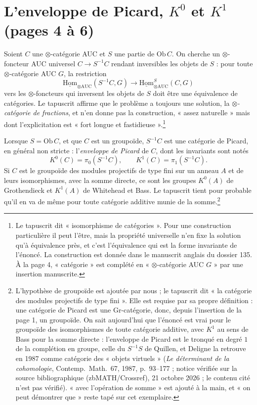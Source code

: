 \documentclass[11pt,a4paper]{article}
\begin{document}
\section*{L'enveloppe de Picard, $K^0$ et $K^1$ (pages 4 à 6)}

Soient $C$ une $\otimes$-catégorie AUC et $S$ une partie de $\mathrm{Ob}\,C$.
On cherche un $\otimes$-foncteur AUC universel $C \to S^{-1}C$ rendant
inversibles les objets de $S$ : pour toute $\otimes$-catégorie AUC $G$, la
restriction
\[ \underline{\mathrm{Hom}}_{\otimes \mathrm{AUC}}(S^{-1}C, G) \longrightarrow
   \underline{\mathrm{Hom}}^{S}_{\otimes \mathrm{AUC}}(C, G) \]
vers les $\otimes$-foncteurs qui inversent les objets de $S$ doit être une
équivalence de catégories. Le tapuscrit affirme que le problème a toujours une
solution, la \emph{$\otimes$-catégorie de fractions}, et n'en donne pas la
construction, « assez naturelle » mais dont l'explicitation est « fort longue
et fastidieuse ».\footnote{Le tapuscrit dit « isomorphisme de catégories ».
Pour une construction particulière il peut l'être, mais la propriété
universelle n'en fixe la solution qu'à équivalence près, et c'est
l'équivalence qui est la forme invariante de l'énoncé. La construction est
donnée dans le manuscrit anglais du dossier 135. À la page 4, « catégorie »
est complété en « $\otimes$-catégorie AUC $G$ » par une insertion manuscrite.}

Lorsque $S = \mathrm{Ob}\,C$, et que $C$ est un groupoïde, $S^{-1}C$ est une
catégorie de Picard, en général non stricte : l'\emph{enveloppe de Picard} de
$C$, dont les invariants sont notés
\[ K^0(C) = \pi_0(S^{-1}C), \qquad K^1(C) = \pi_1(S^{-1}C) . \]
Si $C$ est le groupoïde des modules projectifs de type fini sur un anneau $A$
et de leurs isomorphismes, avec la somme directe, ce sont les groupes
$K^0(A)$ de Grothendieck et $K^1(A)$ de Whitehead et Bass. Le tapuscrit tient
pour probable qu'il en va de même pour toute catégorie additive munie de la
somme.\footnote{L'hypothèse de groupoïde est ajoutée par nous ; le tapuscrit
dit « la catégorie des modules projectifs de type fini ». Elle est requise
par sa propre définition : une catégorie de Picard est une Gr-catégorie, donc,
depuis l'insertion de la page 1, un groupoïde. On sait aujourd'hui que
l'énoncé est vrai pour le groupoïde des isomorphismes de toute catégorie
additive, avec $K^1$ au sens de Bass pour la somme directe : l'enveloppe de
Picard est le tronqué en degré $1$ de la complétion en groupe, celle du
$S^{-1}S$ de Quillen, et Deligne la retrouve en 1987 comme catégorie des « objets virtuels » (\emph{Le déterminant de la cohomologie}, Contemp.\ Math.\ 67, 1987, p.~93--177 ; notice vérifiée sur la source bibliographique (zbMATH/Crossref), 21 octobre 2026 ; le contenu cité n'est pas vérifié). « avec
l'opération de somme » est ajouté à la main, et « on peut démontrer que »
reste tapé sur cet exemplaire.}
\end{document}
